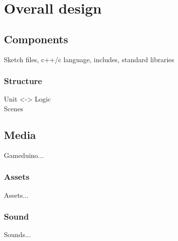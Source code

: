 \chapter{Overall design}

\section{Components}
Sketch files, c++/c language, includes, standard libraries

\subsection{Structure}
Unit <-> Logic\\
Scenes

\section{Media}
Gameduino...

\subsection{Assets}
Assets...

\subsection{Sound}
Sounds...